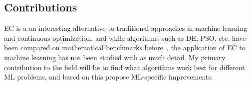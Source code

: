 \subsection{Contributions}

EC is a an interesting alternative to traditional approaches in machine learning and continuous optimization, and while algorithms such as DE, PSO, etc. have been compared on mathematical benchmarks before~\cite{vesterstrom2004comparative, price1997differential}, the application of EC to machine learning has not been studied with as much detail. My primary contribution to the field will be to find what algorithms work best for different ML problems, and based on this propose ML-specific improvements.
